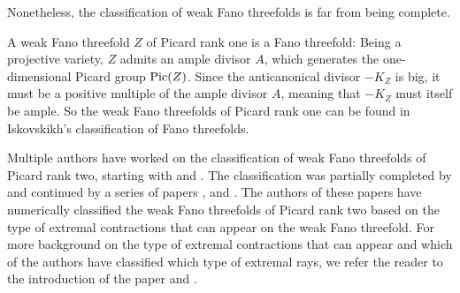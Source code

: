 \documentclass[english,11pt,reqno]{amsart}
\newcommand{\Pic}{\textup{Pic}}
\begin{document}
	Nonetheless, the classification of weak Fano threefolds is far from being complete. \par 
	A weak Fano threefold $Z$ of Picard rank one is a Fano threefold: Being a projective variety, $Z$ admits an ample divisor $A$, which generates the one-dimensional Picard group $\Pic(Z)$. Since the anticanonical divisor $-K_Z$ is big, it must be a positive multiple of the ample divisor $A$, meaning that $-K_Z$ must itself be ample. So the weak Fano threefolds of Picard rank one can be found in Iskovskikh's classification of Fano threefolds.\par
	Multiple authors have worked on the classification of weak Fano threefolds of Picard rank two, starting with \cite{Weak_Fano_threefolds_I-Jahnke_Peternell_Radloff} and \cite{Weak_Fano_threefolds_II-Jahnke_Peternell_Radloff}. The classification was partially completed by \cite{Takeuchi-Weak_Fano_threefolds_del_Pezzo_fibration} and continued by a series of papers \cite{Cutrone_Marshburn_Classification}, \cite{Arap_Cutrone_Marshburn_weak_Fano_threefolds_Existence} and \cite{Cutrone_Marshburn_Update}. The authors of these papers have numerically classified the weak Fano threefolds of Picard rank two based on the type of extremal contractions that can appear on the weak Fano threefold. For more background on the type of extremal contractions that can appear and which of the authors have classified which type of extremal rays, we refer the reader to the introduction of the paper \cite{Cutrone_Marshburn_Classification} and .\par  
	
\end{document}

